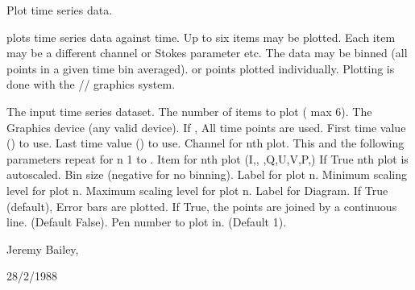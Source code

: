 \begin{manroutinedescription}
        Plot time series data.

        {} plots time series data against time. Up to six items %
may be
        plotted. Each item may be a different channel or Stokes parameter etc.
        The data may be binned (all points in a given time bin averaged).
        or points plotted individually. Plotting is done with the
        {}/{}/{} graphics system.

\begin{manparametertable}
  The input %
time series dataset.
  The number of items to plot (%
max 6).
   The Graphics device (any %
valid {} device).
  If {}, All time %
points are used.
   First time value ({}) to use.
   Last time value ({}) %
to use.
  Channel for nth plot. This and the %
following
                               parameters repeat for
                               n {\mantt{=}} 1 to {}.
     Item for nth plot (I,{},{%
},Q,U,V,P,{})
  If True nth plot is autoscaled.
   Bin size (negative for no binning).
     Label for plot n.
     Minimum scaling level for plot n.
     Maximum scaling level for plot n.
     Label for Diagram.
  If True (default), Error %
bars are plotted.
  If True, the points are joined %
by a
                               continuous line. (Default False).
  {} Pen number to %
plot in. (Default 1).

\end{manparametertable}
         Jeremy Bailey, {}

         28/2/1988

\end{manroutinedescription}
